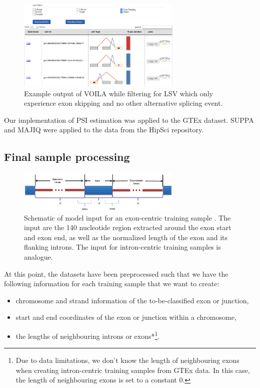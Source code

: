 \begin{figure}
	\centering\includegraphics[width=0.7\textwidth]{../visualizations/ch4-methods/voila_example.png} 
	\caption[Four-chamber illustration of the human heart.]{Example output of VOILA while filtering for LSV which only experience exon skipping and no other alternative splicing event. }
	\label{fig:voilaexample}
\end{figure}


Our implementation of PSI estimation was applied to the GTEx dataset. SUPPA and MAJIQ were applied to the data from the HipSci repository.
\subsection{Final sample processing} \label{subsec:finalsampleprocessing}

\begin{figure}
	\centering\includegraphics[width=0.7\textwidth]{../visualizations/ch4-methods/input_schematic.png} 
	\caption[bla.]{Schematic of model input for an exon-centric training sample \cite{dsc}. The input are the 140 nucleotide region extracted around the exon start and exon end, as well as the normalized length of the exon and its flanking introns. The input for intron-centric training samples is analogue.}
	\label{fig:inputschematic}
\end{figure}

At this point, the datasets have been preprocessed such that we have the following information for each training sample that we want to create: 
\begin{itemize}
	\item chromosome and strand information of the to-be-classified exon or junction,
	\item start and end coordinates of the exon or junction within a chromosome,
	\item the lengths of neighbouring introns or exons*\footnote{Due to data limitations, we don't know the length of neighbouring exons when creating intron-centric training samples from GTEx data. In this case, the length of neighbouring exons is set to a constant 0. }.
\end{itemize}

